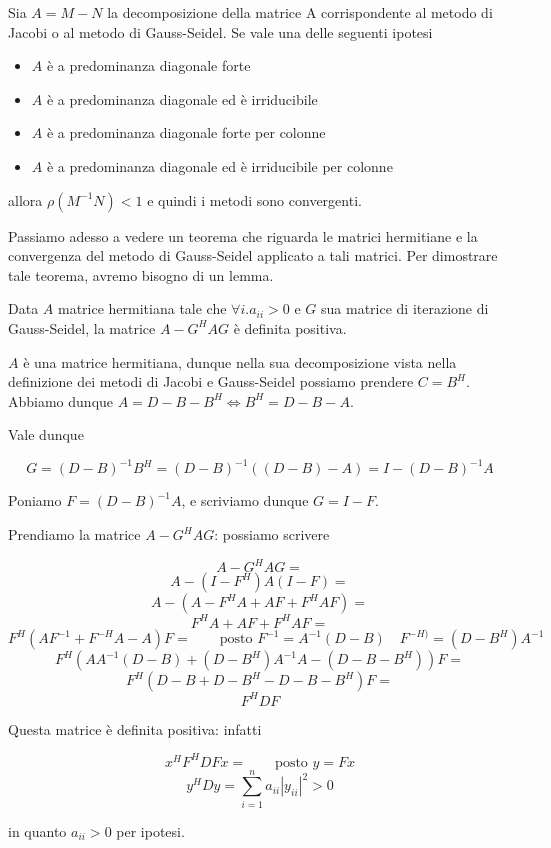 \begin{theo}
Sia $A = M-N$ la decomposizione della matrice A corrispondente al
metodo di Jacobi o al metodo di Gauss-Seidel. Se vale una delle
seguenti ipotesi
\begin{itemize}
\item $A$ \`e a predominanza diagonale forte
\item $A$ \`e a predominanza diagonale ed \`e irriducibile
\item $A$ \`e a predominanza diagonale forte per colonne
\item $A$ \`e a predominanza diagonale ed \`e irriducibile per colonne
\end{itemize}
allora $\rho(M^{-1}N) <1$ e quindi i metodi sono convergenti.
\end{theo}





Passiamo adesso a vedere un teorema che riguarda le matrici hermitiane e la convergenza del metodo di Gauss-Seidel applicato a tali matrici. Per dimostrare tale teorema, avremo bisogno di un lemma.

\begin{lemma}\label{lem:aghag}
Data $A$  matrice hermitiana tale che $ \forall i.a_{ii} > 0 $ e $G$ sua matrice di iterazione di Gauss-Seidel, la matrice $ A - G^HAG $ \`e definita positiva.
\end{lemma}
\begin{thproof}
$A$ \`e una matrice hermitiana, dunque nella sua decomposizione vista nella definizione dei metodi di Jacobi e Gauss-Seidel possiamo prendere $ C = B^H $. Abbiamo dunque $ A = D - B - B^H \Leftrightarrow B^H = D - B - A $.

Vale dunque

 \[ G = (D-B)^{-1}B^H = (D-B)^{-1}((D - B) - A) = I - (D - B)^{-1}A \]
 
Poniamo $ F = (D - B)^{-1}A $, e scriviamo dunque $ G = I - F $.

Prendiamo la matrice $ A - G^HAG $: possiamo scrivere

\[ A - G^HAG = \]
\[ A - (I-F^H)A(I-F) = \]
\[ A - (A - F^HA + AF + F^HAF) = \]
\[ F^HA + AF + F^HAF = \]
\[ F^H(AF^{-1} + F^{-H}A - A)F = \qquad \text{posto } F^{-1}=A^{-1}(D-B) \quad F^{-H)}=(D-B^{H})A^{-1} \]
\[ F^H(AA^{-1}(D-B) + (D-B^{H})A^{-1}A - (D - B - B^H))F = \]
\[ F^H(D - B + D - B^H - D - B - B^H)F = \]
\[ F^HDF\]

Questa matrice \`e definita positiva: infatti 

\[ x^HF^HDFx =  \qquad \text{posto } y = Fx\]
\[ y^HDy = \sum^{n}_{i=1}a_{ii}|y_{ii}|^2 >0\]

in quanto $ a_{ii} > 0 $ per ipotesi.
\end{thproof}


